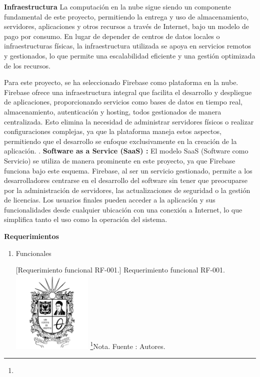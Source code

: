 \begin{itemize}
{\begin{itemize}
    
\end{itemize}

\textbf{Infraestructura }
\newline
La computación en la nube sigue siendo un componente fundamental de este proyecto, permitiendo la entrega y uso de almacenamiento, servidores, aplicaciones y otros recursos a través de Internet, bajo un modelo de pago por consumo. En lugar de depender de centros de datos locales o infraestructuras físicas, la infraestructura utilizada se apoya en servicios remotos y gestionados, lo que permite una escalabilidad eficiente y una gestión optimizada de los recursos.

Para este proyecto, se ha seleccionado Firebase como plataforma en la nube. Firebase ofrece una infraestructura integral que facilita el desarrollo y despliegue de aplicaciones, proporcionando servicios como bases de datos en tiempo real, almacenamiento, autenticación y hosting, todos gestionados de manera centralizada. Esto elimina la necesidad de administrar servidores físicos o realizar configuraciones complejas, ya que la plataforma maneja estos aspectos, permitiendo que el desarrollo se enfoque exclusivamente en la creación de la aplicación. \cite{FirebaseCloud}.
\newline
\textbf{Software as a Service (SaaS) :}
El modelo SaaS (Software como Servicio) se utiliza de manera prominente en este proyecto, ya que Firebase funciona bajo este esquema. Firebase, al ser un servicio gestionado, permite a los desarrolladores centrarse en el desarrollo del software sin tener que preocuparse por la administración de servidores, las actualizaciones de seguridad o la gestión de licencias. Los usuarios finales pueden acceder a la aplicación y sus funcionalidades desde cualquier ubicación con una conexión a Internet, lo que simplifica tanto el uso como la operación del sistema. \cite{FirebaseSAAS}


\textbf{Requerimientos}

\begin{enumerate}
    \item Funcionales
        \par\vspace{2mm}
        \begin{minipage}{0.9\textwidth}
        \centering
        [{Requerimiento funcional RF-001.}]{ Requerimiento funcional RF-001. }
        \label{req1}
        \includegraphics[width=0.3\textwidth]{Content/Images/Escudo_UD.png}
        \footnote{}{Nota. \textup{Fuente : Autores.}}
        \end{minipage}
        

\end{enumerate}}
\end{itemize}
